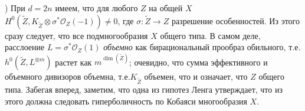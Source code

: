 )
При $d=2n$ имеем, что для любого $Z$ на общей $X$ $H^0(\tilde{Z},
K_{\tilde{Z}}\otimes \sigma^*\mathcal{O}_Z(-1))\neq 0$, где
$\sigma\colon\tilde{Z}\rightarrow Z$ разрешение особенностей. Из этого сразу
следует, что все подмногообразия $X$ общего типа. В самом деле, расслоение
$L=\sigma^*\mathcal{O}_Z(1)$ \emph{объемно} как бирациональный прообраз обильного,
т.е.$h^0(\tilde{Z}, L^{\otimes m})$ растет как $m^{\dim(\tilde{Z})}$;
очевидно, что сумма эффективного и объемного дивизоров объемна, т.е.$K_{\tilde{Z}}$ объемен, что и означает, что $Z$ общего типа. Забегая вперед,
заметим, что одна из
гипотез Ленга утверждает, что из этого должна следовать
гиперболичность по Кобаяси многообразия $X$.
